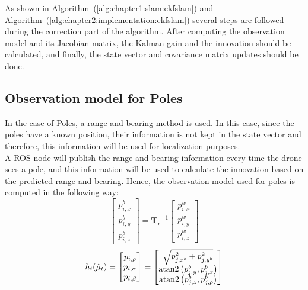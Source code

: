 As shown in Algorithm~(\ref{alg:chapter1:slam:ekfslam}) and Algorithm~(\ref{alg:chapter2:implementation:ekfslam}) several steps are followed during the correction part of the algorithm. After computing the observation model and its Jacobian matrix, the Kalman gain and the innovation should be calculated, and finally, the state vector and covariance matrix updates should be done.

\subsection{Observation model for Poles}
\label{subsec:chapter2:correction:poles}
In the case of Poles, a range and bearing method is used. In this case, since the poles have a known position, their information is not kept in the state vector and therefore, this information will be used for localization purposes.\\

A \ac{ROS} node will publish the range and bearing information every time the drone sees a pole, and this information will be used to calculate the innovation based on the predicted range and bearing. Hence, the observation model used for poles is computed in the following way:
\begin{equation}
    \begin{bmatrix}
        p_{i, x}^b \\ p_{i, y}^b \\ p_{i, z}^b
    \end{bmatrix} = \bm{T_r}^{-1} \begin{bmatrix}
        p_{i, x}^w \\ p_{i, y}^w \\ p_{i, z}^w
\end{bmatrix}
\label{eq:chapter2:correction:pole:world2body_transform}
\end{equation}
\begin{equation}
    h_i(\hat\mu_t) = \begin{bmatrix}
        p_{i, \rho} \\ p_{i, \alpha} \\ p_{i, \beta}
    \end{bmatrix} = \begin{bmatrix}
    \sqrt{ p_{j, x^b}^2 + p_{j, y^b}^2 } \\
    \operatorname{atan2}\left(p_{j, y}^b, p_{j, x}^b\right) \\
    \operatorname{atan2}\left(p_{j, z}^b, p_{j,\rho}^b\right)
\end{bmatrix}
\label{eq:chapter2:correction:pole:range_bearing}
\end{equation}

